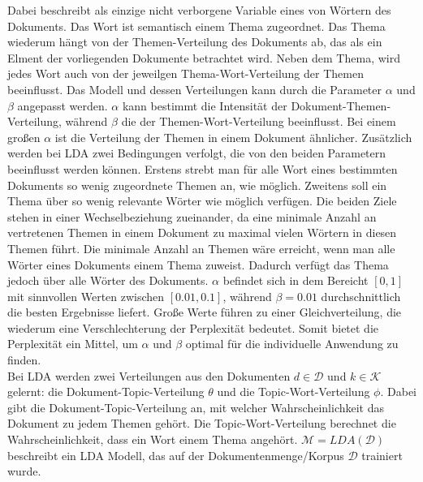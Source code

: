 \documentclass[german,version-2020-11]{uzl-thesis}
\begin{document}
Dabei beschreibt  als einzige nicht verborgene Variable eines von  Wörtern des Dokuments. Das Wort ist semantisch einem Thema  zugeordnet. Das Thema wiederum hängt von der Themen-Verteilung  des Dokuments ab, das als ein Elment der  vorliegenden Dokumente betrachtet wird. Neben dem Thema, wird jedes Wort auch von der jeweilgen Thema-Wort-Verteilung \mathcal{\phi} der  Themen beeinflusst. Das Modell und dessen Verteilungen kann durch die Parameter $\alpha$ und $\beta$ angepasst werden. $\alpha$ kann bestimmt die Intensität der Dokument-Themen-Verteilung, während $\beta$ die der Themen-Wort-Verteilung beeinflusst. Bei einem großen $\alpha$ ist die Verteilung der Themen in einem Dokument ähnlicher. Zusätzlich werden bei LDA zwei Bedingungen verfolgt, die von den beiden Parametern beeinflusst werden können. Erstens strebt man für alle Wort eines bestimmten Dokuments so wenig zugeordnete Themen an, wie möglich. Zweitens soll ein Thema über so wenig relevante Wörter wie möglich verfügen. Die beiden Ziele stehen in einer Wechselbeziehung zueinander, da eine minimale Anzahl an vertretenen Themen in einem Dokument zu maximal vielen Wörtern in diesen Themen führt. Die minimale Anzahl an Themen wäre erreicht, wenn man alle Wörter eines Dokuments einem Thema zuweist. Dadurch verfügt das Thema jedoch über alle Wörter des Dokuments. $\alpha$ befindet sich in dem Bereicht $[0,1]$ mit sinnvollen Werten zwischen $[0.01, 0.1]$, während $\beta =0.01$ durchschnittlich die besten Ergebnisse liefert. Große Werte führen zu einer Gleichverteilung, die wiederum eine Verschlechterung der Perplexität bedeutet. Somit bietet die Perplexität ein Mittel, um $\alpha$ und $\beta$ optimal für die individuelle Anwendung zu finden. \\

Bei LDA werden zwei Verteilungen aus den Dokumenten $d \in \mathcal{D}$ und $k \in \mathcal{K}$gelernt: die Dokument-Topic-Verteilung $\theta$ und die Topic-Wort-Verteilung $\phi$. Dabei gibt die Dokument-Topic-Verteilung an, mit welcher Wahrscheinlichkeit das Dokument zu jedem Themen gehört. Die Topic-Wort-Verteilung berechnet die Wahrscheinlichkeit, dass ein Wort einem Thema angehört. $\mathcal{M} = LDA(\mathcal{D})$ beschreibt ein LDA Modell, das auf der Dokumentenmenge/Korpus $\mathcal{D}$ trainiert wurde.
\end{document}
